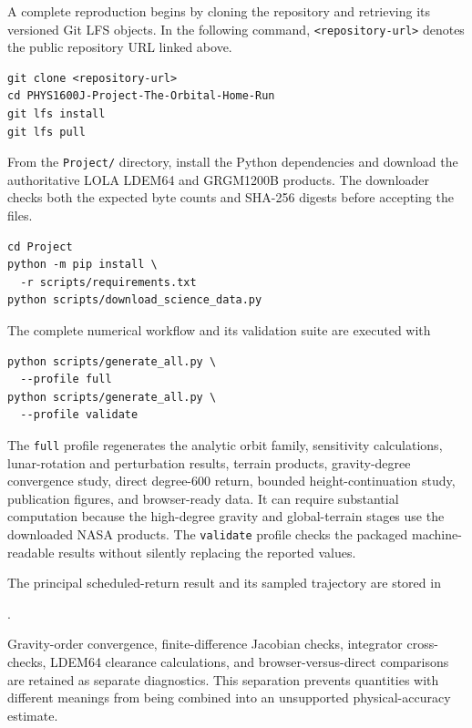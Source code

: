 A complete reproduction begins by cloning the repository and retrieving its
versioned Git LFS objects. In the following command,
\texttt{<repository-url>} denotes the public repository URL linked above.

\begingroup
\footnotesize
\begin{verbatim}
git clone <repository-url>
cd PHYS1600J-Project-The-Orbital-Home-Run
git lfs install
git lfs pull
\end{verbatim}
\endgroup

From the \texttt{Project/} directory, install the Python dependencies and
download the authoritative LOLA LDEM64 and GRGM1200B products. The downloader
checks both the expected byte counts and SHA-256 digests before accepting the
files.

\begingroup
\footnotesize
\begin{verbatim}
cd Project
python -m pip install \
  -r scripts/requirements.txt
python scripts/download_science_data.py
\end{verbatim}
\endgroup

The complete numerical workflow and its validation suite are executed with

\begingroup
\footnotesize
\begin{verbatim}
python scripts/generate_all.py \
  --profile full
python scripts/generate_all.py \
  --profile validate
\end{verbatim}
\endgroup

The \texttt{full} profile regenerates the analytic orbit family, sensitivity
calculations, lunar-rotation and perturbation results, terrain products,
gravity-degree convergence study, direct degree-600 return, bounded
height-continuation study, publication figures, and browser-ready data. It
can require substantial computation because the high-degree gravity and
global-terrain stages use the downloaded NASA products. The
\texttt{validate} profile checks the packaged machine-readable results
without silently replacing the reported values.

The principal scheduled-return result and its sampled trajectory are stored
in

\begin{center}

.
\end{center}

Gravity-order convergence, finite-difference Jacobian checks, integrator
cross-checks, LDEM64 clearance calculations, and browser-versus-direct
comparisons are retained as separate diagnostics. This separation prevents
quantities with different meanings from being combined into an unsupported
physical-accuracy estimate.

